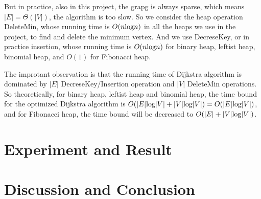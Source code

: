 \documentclass[12pt]{article}
\begin{document}
    But in practice, also in this project, the grapg is always sparse, 
    which means $|E| = \Theta(|V|)$, the algorithm is too slow. 
    So we consider the heap operation DeleteMin, whose running time is 
    $O(n\textup{log}n)$ in all the heaps we use in the project, to find and delete the
    minimum vertex. And we use DecreseKey, or in practice insertion, whose 
    running time is $O(n\textup{log}n)$ for binary heap, leftist heap,  
    binomial heap, and $O(1)$ for Fibonacci heap.

    The improtant observation is that the running time of Dijkstra algorithm 
    is dominated by $|E|$ DecreseKey/Insertion operation and $|V|$ DeleteMin 
    operations. So theoretically, for binary heap, leftist heap and binomial 
    heap, the time bound for the optimized Dijkstra algorithm is 
    $O(|E|\textup{log}|V| + |V|\textup{log}|V|) = O(|E|\textup{log}|V|)$, and for Fibonacci heap, 
    the time bound will be decreased to $O(|E| + |V|\textup{log}|V|)$.

    \section{Experiment and Result}
        
    \section{Discussion and Conclusion}
        
\end{document}
